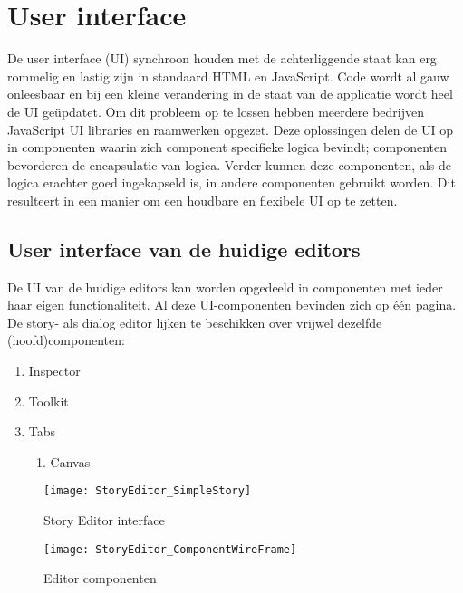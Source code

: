 \section{User interface}
De user interface (UI) synchroon houden met de achterliggende staat kan erg rommelig en lastig zijn in standaard HTML en JavaScript. Code wordt al gauw onleesbaar en bij een kleine verandering in de staat van de applicatie wordt heel de UI geüpdatet. Om dit probleem op te lossen hebben meerdere bedrijven JavaScript UI libraries en raamwerken opgezet. Deze oplossingen delen de UI op in componenten waarin zich component specifieke logica bevindt; componenten bevorderen de encapsulatie van logica. Verder kunnen deze componenten, als de logica erachter goed ingekapseld is, in andere componenten gebruikt worden. Dit resulteert in een manier om een houdbare en flexibele UI op te zetten.

\subsection{User interface van de huidige editors}
De UI van de huidige editors kan worden opgedeeld in componenten met ieder haar eigen functionaliteit. Al deze UI-componenten bevinden zich op één pagina. De story- als dialog editor lijken te beschikken over vrijwel dezelfde (hoofd)componenten:
\begin{enumerate}
    \item Inspector
    \item Toolkit
    \item Tabs
    \begin{enumerate}
        \item Canvas
    \end{enumerate}
\end{enumerate}

\begin{figure}[H]
    \begin{minipage}[b]{0.45\textwidth}
        \texttt{[image: StoryEditor\_SimpleStory]}
        \caption{Story Editor interface}
        \label{fig:storyeditorinterface}
    \end{minipage}
    \hfill
    \begin{minipage}[b]{0.45\textwidth}
        \texttt{[image: StoryEditor\_ComponentWireFrame]}
        \caption{Editor componenten}
        \label{fig:storyeditorcomponents}
    \end{minipage}
\end{figure}


